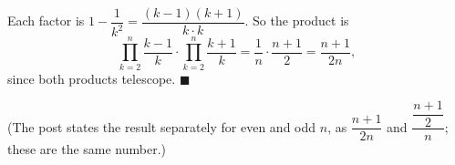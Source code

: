 Each factor is $1-\dfrac1{k^2}=\dfrac{(k-1)(k+1)}{k\cdot k}$. So the product is
\[\prod_{k=2}^{n}\dfrac{k-1}{k}\cdot\prod_{k=2}^{n}\dfrac{k+1}{k}=\dfrac1n\cdot\dfrac{n+1}{2}=\dfrac{n+1}{2n},\]
since both products telescope. $\blacksquare$

(The post states the result separately for even and odd $n$, as $\dfrac{n+1}{2n}$ and $\dfrac{\dfrac{n+1}2}{n}$; these are the same number.)
